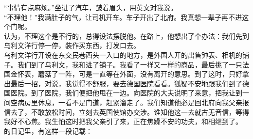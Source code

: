 “事情有点麻烦。”坐进了汽车，皱着眉头，用英文对我说。\\

“不理他！”我满肚子的气，让司机开车。车子开出了北府。我真想一辈子再不进这个门呢。\\

认为，不理这个是不行的，总得设法摆脱他。在路上，他想出了个办法：我们先到乌利文洋行停一停，装作买东西，打发口去。\\

乌利文洋行开设在东交民巷西头一入口的地方，是外国人开的出售钟表、相机的铺子。我们到了乌利文，我和进了铺子。我看了一样又一样的商品，最后挑了一只法国金怀表，蘑菇了一阵，可是一直等在外面，没有离开的意思。到了这时，只好拿出最后一招，对说，我觉得不舒服，要去德国医院看看。狐疑不安地跟我们到了德国医院。到了医院，我们便把他甩在一边。向医院的大夫说明了来意，把我让到一间空病房里休息，一看不是门道，赶紧溜走了。我们知道他必是回北府向我父亲报信去了，不敢放松时间，立刻去英国使馆办交涉。谁知他这一去就古无音信，等得我好不心焦。我生怕这时把我父亲引了来，正在焦躁不安的功夫，和相继到了。\\

的日记里，有这样一段记载：\\

